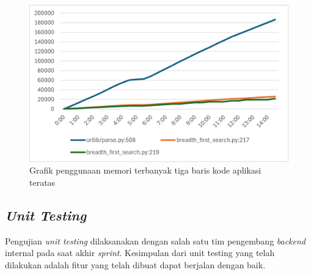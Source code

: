 \documentclass[
	a4paper, %
	10pt, %
	unnumberedsections, %
	twoside, %
]{LTJournalArticle}
\begin{document}
\begin{figure}[H]
	\includegraphics[width=\linewidth]{line_memusage_chart.png}
	\caption{Grafik penggunaan memori terbanyak tiga baris kode aplikasi teratas}
	\label{gambar:linemem}
\end{figure}

\subsection{\textit{Unit Testing}}

Pengujian \textit{unit testing} dilaksanakan dengan salah satu tim pengembang \textit{backend} internal pada saat akhir \textit{sprint}. Kesimpulan dari unit testing yang telah dilakukan adalah fitur yang telah dibuat dapat berjalan dengan baik.
\end{document}
